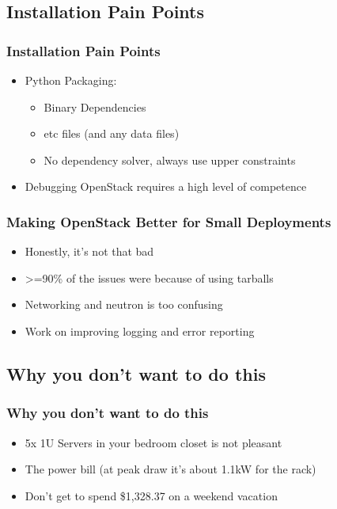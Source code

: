 \documentclass[aspectratio=169,11pt,hyperref={colorlinks=true}]{beamer}
\begin{document}
\subsection{Installation Pain Points}
\begin{frame}
    \frametitle{Installation Pain Points}
    \begin{itemize}
        \item Python Packaging:
            \begin{itemize}
                \item Binary Dependencies
                \item etc files (and any data files)
                \item No dependency solver, always use upper constraints
            \end{itemize}
        \item Debugging OpenStack requires a high level of competence
    \end{itemize}
\end{frame}
\begin{frame}
    \frametitle{Making OpenStack Better for Small Deployments}
    \begin{itemize}
        \item Honestly, it's not that bad
        \item >=90\% of the issues were because of using tarballs
        \item Networking and neutron is too confusing
        \item Work on improving logging and error reporting
    \end{itemize}
\end{frame}

\subsection{Why you don't want to do this}
\begin{frame}
    \frametitle{Why you don't want to do this}
    \begin{itemize}
        \item 5x 1U Servers in your bedroom closet is not pleasant
        \item The power bill (at peak draw it's about 1.1kW for the rack)
        \item Don't get to spend \$1,328.37 on a weekend vacation
    \end{itemize}
\end{frame}
\end{document}
